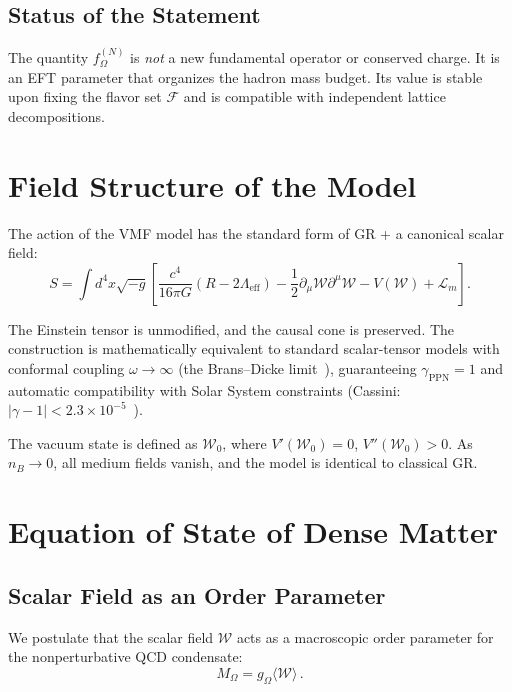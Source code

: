 \documentclass[11pt,a4paper]{article}
\begin{document}
\subsection{Status of the Statement}

The quantity $f_\Omega^{(N)}$ is \emph{not} a new fundamental operator or conserved charge. It is an EFT parameter that organizes the hadron mass budget. Its value is stable upon fixing the flavor set $\mathcal{F}$ and is compatible with independent lattice decompositions.

\section{Field Structure of the Model}
\label{sec:field}

The action of the VMF model has the standard form of GR + a canonical scalar field:
\begin{equation}
S = \int d^4x \sqrt{-g} \left[ \frac{c^4}{16\pi G}(R - 2\Lambda_{\text{eff}}) - \frac{1}{2}\partial_\mu \mathcal{W} \partial^\mu \mathcal{W} - V(\mathcal{W}) + \mathcal{L}_m \right].
\label{eq:action}
\end{equation}

The Einstein tensor is unmodified, and the causal cone is preserved. The construction is mathematically equivalent to standard scalar-tensor models with conformal coupling $\omega \to \infty$ (the Brans--Dicke limit~\cite{Will2014}), guaranteeing $\gamma_{\text{PPN}} = 1$ and automatic compatibility with Solar System constraints (Cassini: $|\gamma - 1| < 2.3 \times 10^{-5}$~\cite{Cassini2003}).

The vacuum state is defined as $\mathcal{W}_0$, where $V'(\mathcal{W}_0) = 0$, $V''(\mathcal{W}_0) > 0$. As $n_B \to 0$, all medium fields vanish, and the model is identical to classical GR.

\section{Equation of State of Dense Matter}
\label{sec:eos}

\subsection{Scalar Field as an Order Parameter}

We postulate that the scalar field $\mathcal{W}$ acts as a macroscopic order parameter for the nonperturbative QCD condensate:
\begin{equation}
M_\Omega = g_\Omega \langle \mathcal{W} \rangle\,.
\end{equation}
\end{document}

